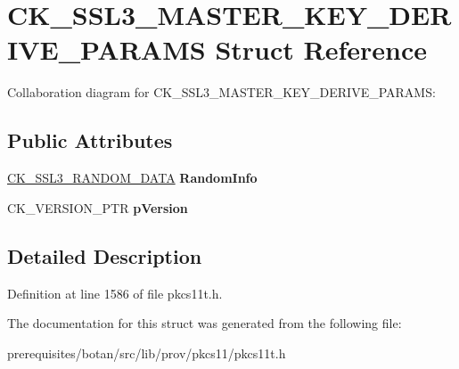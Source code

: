 \hypertarget{struct_c_k___s_s_l3___m_a_s_t_e_r___k_e_y___d_e_r_i_v_e___p_a_r_a_m_s}{}\section{C\+K\+\_\+\+S\+S\+L3\+\_\+\+M\+A\+S\+T\+E\+R\+\_\+\+K\+E\+Y\+\_\+\+D\+E\+R\+I\+V\+E\+\_\+\+P\+A\+R\+A\+MS Struct Reference}
\label{struct_c_k___s_s_l3___m_a_s_t_e_r___k_e_y___d_e_r_i_v_e___p_a_r_a_m_s}


Collaboration diagram for C\+K\+\_\+\+S\+S\+L3\+\_\+\+M\+A\+S\+T\+E\+R\+\_\+\+K\+E\+Y\+\_\+\+D\+E\+R\+I\+V\+E\+\_\+\+P\+A\+R\+A\+MS\+:
\subsection*{Public Attributes}
\begin{DoxyCompactItemize}
\item 
\mbox{\label{struct_c_k___s_s_l3___m_a_s_t_e_r___k_e_y___d_e_r_i_v_e___p_a_r_a_m_s_aed0581ee201c1a5fe44708c819ad7fd1}} 
\mbox{\hyperlink{struct_c_k___s_s_l3___r_a_n_d_o_m___d_a_t_a}{C\+K\+\_\+\+S\+S\+L3\+\_\+\+R\+A\+N\+D\+O\+M\+\_\+\+D\+A\+TA}} {\bfseries Random\+Info}
\item 
\mbox{\label{struct_c_k___s_s_l3___m_a_s_t_e_r___k_e_y___d_e_r_i_v_e___p_a_r_a_m_s_ab0da9dc184f64ed87ed2f70f742bb9a5}} 
C\+K\+\_\+\+V\+E\+R\+S\+I\+O\+N\+\_\+\+P\+TR {\bfseries p\+Version}
\end{DoxyCompactItemize}


\subsection{Detailed Description}


Definition at line 1586 of file pkcs11t.\+h.



The documentation for this struct was generated from the following file\+:\begin{DoxyCompactItemize}
\item 
prerequisites/botan/src/lib/prov/pkcs11/pkcs11t.\+h\end{DoxyCompactItemize}
